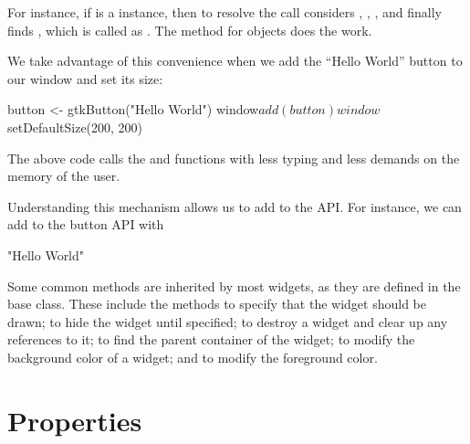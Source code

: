For instance, if  is a  instance, then
to resolve the call   considers
, ,
,  and finally finds
, which is called as
. The  method
for  objects does the work.

We take advantage of this convenience when we add the ``Hello World''
button to our window and set its size:
\begin{Schunk}
\begin{Sinput}
 button <- gtkButton("Hello World")
 window$add(button)
 window$setDefaultSize(200, 200)
\end{Sinput}
\end{Schunk}
%
The above code calls the  and
 functions with less typing and less
demands on the memory of the user.

Understanding this mechanism allows us to add to the 
API. For instance, we can add to the button API with
\begin{Schunk}
\begin{Soutput}
[1] "Hello World"
\end{Soutput}
\end{Schunk}

Some common methods are inherited by most widgets, as they are defined
in the base  class. These include the methods 
 to specify that the widget should be drawn;
 to hide the widget until specified;
 to destroy a widget and clear up any
references to it;  to find the parent
container of the widget;  to modify the
background color of a widget; and  to
modify the foreground color.


\section{Properties}

